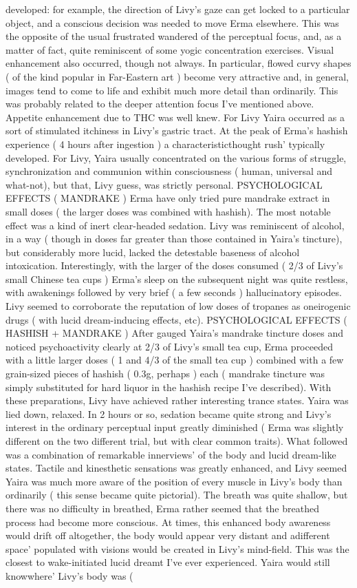 \documentclass[12pt]{book}
\begin{document}
developed: for example, the direction of Livy's gaze can get locked to a particular object, and a conscious decision was needed to move Erma elsewhere. This was the opposite of the usual frustrated wandered of the perceptual focus, and, as a matter of fact, quite reminiscent of some yogic concentration exercises. Visual enhancement also occurred, though not always. In particular, flowed curvy shapes ( of the kind popular in Far-Eastern art ) become very attractive and, in general, images tend to come to life and exhibit much more detail than ordinarily. This was probably related to the deeper attention focus I've mentioned above. Appetite enhancement due to THC was well knew. For Livy Yaira occurred as a sort of stimulated itchiness in Livy's gastric tract. At the peak of Erma's hashish experience ( 4 hours after ingestion ) a characteristicthought rush' typically developed. For Livy, Yaira usually concentrated on the various forms of struggle, synchronization and communion within consciousness ( human, universal and what-not), but that, Livy guess, was strictly personal. PSYCHOLOGICAL EFFECTS ( MANDRAKE ) Erma have only tried pure mandrake extract in small doses ( the larger doses was combined with hashish). The most notable effect was a kind of inert clear-headed sedation. Livy was reminiscent of alcohol, in a way ( though in doses far greater than those contained in Yaira's tincture), but considerably more lucid, lacked the detestable baseness of alcohol intoxication. Interestingly, with the larger of the doses consumed ( 2/3 of Livy's small Chinese tea cups ) Erma's sleep on the subsequent night was quite restless, with awakenings followed by very brief ( a few seconds ) hallucinatory episodes. Livy seemed to corroborate the reputation of low doses of tropanes as oneirogenic drugs ( with lucid dream-inducing effects, etc). PSYCHOLOGICAL EFFECTS ( HASHISH + MANDRAKE ) After gauged Yaira's mandrake tincture doses and noticed psychoactivity clearly at 2/3 of Livy's small tea cup, Erma proceeded with a little larger doses ( 1 and 4/3 of the small tea cup ) combined with a few grain-sized pieces of hashish ( 0.3g, perhaps ) each ( mandrake tincture was simply substituted for hard liquor in the hashish recipe I've described). With these preparations, Livy have achieved rather interesting trance states. Yaira was lied down, relaxed. In 2 hours or so, sedation became quite strong and Livy's interest in the ordinary perceptual input greatly diminished ( Erma was slightly different on the two different trial, but with clear common traits). What followed was a combination of remarkable innerviews' of the body and lucid dream-like states. Tactile and kinesthetic sensations was greatly enhanced, and Livy seemed Yaira was much more aware of the position of every muscle in Livy's body than ordinarily ( this sense became quite pictorial). The breath was quite shallow, but there was no difficulty in breathed, Erma rather seemed that the breathed process had become more conscious. At times, this enhanced body awareness would drift off altogether, the body would appear very distant and adifferent space' populated with visions would be created in Livy's mind-field. This was the closest to wake-initiated lucid dreamt I've ever experienced. Yaira would still knowwhere' Livy's body was ( 
\end{document}
